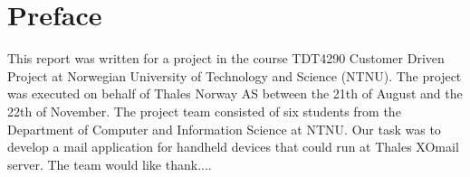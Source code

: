 \chapter*{Preface}

This report was written for a project in the course TDT4290 Customer Driven Project at Norwegian University of Technology and Science (NTNU). The project was executed on behalf of Thales Norway AS between the 21th of August and the 22th of November.
\newline
\newline
The project team consisted of six students from the Department of Computer and Information Science at NTNU. Our task was to develop a mail application for handheld devices that could run at Thales XOmail server.
\newline
\newline
The team would like thank....
